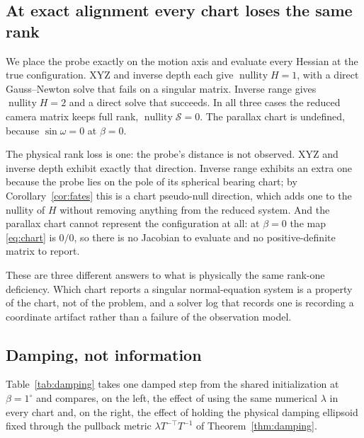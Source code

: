 \documentclass[11pt,a4paper]{article}
\theoremstyle{definition}
\theoremstyle{remark}
\begin{document}
\subsection{At exact alignment every chart loses the same rank}
\label{sec:alignment}
We place the probe exactly on the motion axis and evaluate every Hessian at the true configuration. XYZ and inverse depth each give $\operatorname{nullity}H=1$, with a direct Gauss--Newton solve that fails on a singular matrix. Inverse range gives $\operatorname{nullity}H=2$ and a direct solve that succeeds. In all three cases the reduced camera matrix keeps full rank, $\operatorname{nullity}\mathcal S=0$. The parallax chart is undefined, because $\sin\omega=0$ at $\beta=0$.

The physical rank loss is one: the probe's distance is not observed. XYZ and inverse depth exhibit exactly that direction. Inverse range exhibits an extra one because the probe lies on the pole of its spherical bearing chart; by Corollary~\ref{cor:fates} this is a chart pseudo-null direction, which adds one to the nullity of $H$ without removing anything from the reduced system. And the parallax chart cannot represent the configuration at all: at $\beta=0$ the map \eqref{eq:chart} is $0/0$, so there is no Jacobian to evaluate and no positive-definite matrix to report.

These are three different answers to what is physically the same rank-one deficiency. Which chart reports a singular normal-equation system is a property of the chart, not of the problem, and a solver log that records one is recording a coordinate artifact rather than a failure of the observation model.

\subsection{Damping, not information}
\label{sec:damping-sec}
Table~\ref{tab:damping} takes one damped step from the shared initialization at $\beta=1^\circ$ and compares, on the left, the effect of using the same numerical $\lambda$ in every chart and, on the right, the effect of holding the physical damping ellipsoid fixed through the pullback metric $\lambda T^{-\top}T^{-1}$ of Theorem~\ref{thm:damping}.
\end{document}
